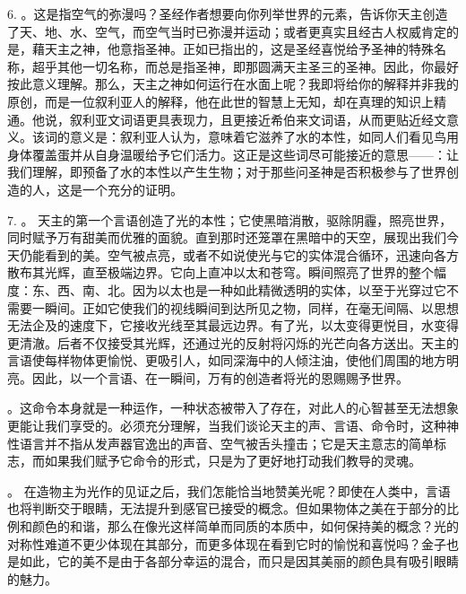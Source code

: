 6. 。这是指空气的弥漫吗？圣经作者想要向你列举世界的元素，告诉你天主创造了天、地、水、空气，而空气当时已弥漫并运动；或者更真实且经古人权威肯定的是，藉天主之神，他意指圣神。正如已指出的，这是圣经喜悦给予圣神的特殊名称，超乎其他一切名称，而总是指圣神，即那圆满天主圣三的圣神。因此，你最好按此意义理解。那么，天主之神如何运行在水面上呢？我即将给你的解释并非我的原创，而是一位叙利亚人的解释，他在此世的智慧上无知，却在真理的知识上精通。他说，叙利亚文词语更具表现力，且更接近希伯来文词语，从而更贴近经文意义。该词的意义是：叙利亚人认为，意味着它滋养了水的本性，如同人们看见鸟用身体覆盖蛋并从自身温暖给予它们活力。这正是这些词尽可能接近的意思——：让我们理解，即预备了水的本性以产生生物；对于那些问圣神是否积极参与了世界创造的人，这是一个充分的证明。\par

7. 。 天主的第一个言语创造了光的本性；它使黑暗消散，驱除阴霾，照亮世界，同时赋予万有甜美而优雅的面貌。直到那时还笼罩在黑暗中的天空，展现出我们今天仍能看到的美。空气被点亮，或者不如说使光与它的实体混合循环，迅速向各方散布其光辉，直至极端边界。它向上直冲以太和苍穹。瞬间照亮了世界的整个幅度：东、西、南、北。因为以太也是一种如此精微透明的实体，以至于光穿过它不需要一瞬间。正如它使我们的视线瞬间到达所见之物，同样，在毫无间隔、以思想无法企及的速度下，它接收光线至其最远边界。有了光，以太变得更悦目，水变得更清澈。后者不仅接受其光辉，还通过光的反射将闪烁的光芒向各方送出。天主的言语使每样物体更愉悦、更吸引人，如同深海中的人倾注油，使他们周围的地方明亮。因此，以一个言语、在一瞬间，万有的创造者将光的恩赐赐予世界。\par

。这命令本身就是一种运作，一种状态被带入了存在，对此人的心智甚至无法想象更能让我们享受的。必须充分理解，当我们谈论天主的声、言语、命令时，这种神性语言并不指从发声器官逸出的声音、空气被舌头撞击；它是天主意志的简单标志，而如果我们赋予它命令的形式，只是为了更好地打动我们教导的灵魂。\par

。 在造物主为光作的见证之后，我们怎能恰当地赞美光呢？即使在人类中，言语也将判断交于眼睛，无法提升到感官已接受的概念。但如果物体之美在于部分的比例和颜色的和谐，那么在像光这样简单而同质的本质中，如何保持美的概念？光的对称性难道不更少体现在其部分，而更多体现在看到它时的愉悦和喜悦吗？金子也是如此，它的美不是由于各部分幸运的混合，而只是因其美丽的颜色具有吸引眼睛的魅力。\par

